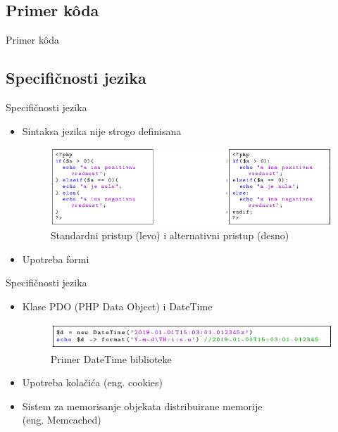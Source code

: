 \documentclass{beamer}
\begin{document}
\subsection{Primer k\^{o}da}
\begin{frame}{Primer k\^{o}da}
    
\end{frame}

\subsection{Specifičnosti jezika}
\begin{frame}{Specifičnosti jezika}
    \begin{itemize}
		\item Sintaksa jezika nije strogo definisana
		
		\begin{figure}[h!]
                \begin{center}
                \includegraphics[scale=0.40]{kod.png}
                \end{center}
                \caption{Standardni pristup (levo) i alternativni pristup (desno)}
                \label{fig:kod}
                \end{figure}
                
		\item Upotreba formi
	\end{itemize}
\end{frame}

\begin{frame}{Specifičnosti jezika}
    \begin{itemize}
        \item Klase PDO (PHP Data Object) i DateTime
        
        \begin{figure}[h!]
        \begin{center}
        \includegraphics[scale=0.45]{datetime.png}
        \end{center}
        \caption{Primer DateTime biblioteke}
        \label{fig:datetime}
        \end{figure}
        
        \item Upotreba kolačića (eng. cookies)
        \item Sistem za memorisanje objekata distribuirane memorije \\ (eng. Memcached)
    \end{itemize}
\end{frame}
\end{document}
